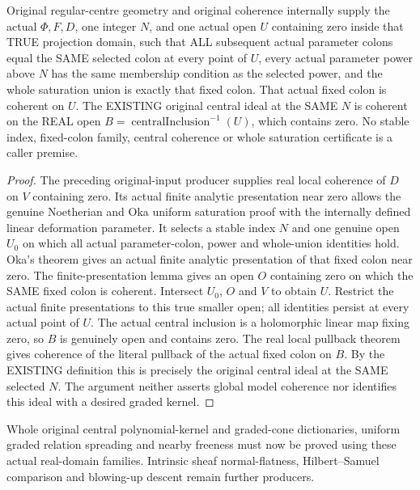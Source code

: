 \begin{theorem}
\label{hir:real-domain-original-exact-deformation-central-model}
\leanok
Original regular-centre geometry and original coherence internally
supply the actual $\Phi,F,D$, one integer $N$, and one actual open $U$
containing zero inside that TRUE projection domain, such that ALL
subsequent actual parameter colons equal the SAME selected colon at
every point of $U$, every actual parameter power above $N$ has the
same membership condition as the selected power, and the whole
saturation union is exactly that fixed colon. That actual fixed colon
is coherent on $U$. The EXISTING original central ideal at the SAME
$N$ is coherent on the REAL open
$B=\operatorname{centralInclusion}^{-1}(U)$, which contains zero.
No stable index, fixed-colon family, central coherence or whole
saturation certificate is a caller premise.
\end{theorem}
\begin{proof}
The preceding original-input producer supplies real local coherence
of $D$ on $V$ containing zero. Its actual finite analytic presentation
near zero allows the genuine Noetherian and Oka uniform saturation
proof with the internally defined linear deformation parameter.
It selects a stable index $N$ and one genuine open $U_0$ on which
all actual parameter-colon, power and whole-union identities hold.
Oka's theorem gives an actual finite analytic presentation of that
fixed colon near zero. The finite-presentation lemma gives an open
$O$ containing zero on which the SAME fixed colon is coherent.
Intersect $U_0$, $O$ and $V$ to obtain $U$. Restrict the actual finite
presentations to this true smaller open; all identities persist at
every actual point of $U$. The actual central inclusion is a
holomorphic linear map fixing zero, so $B$ is genuinely open and
contains zero. The real local pullback theorem gives coherence of
the literal pullback of the actual fixed colon on $B$. By the
EXISTING definition this is precisely the original central ideal
at the SAME selected $N$. The argument neither asserts global model
coherence nor identifies this ideal with a desired graded kernel.
\end{proof}

Whole original central polynomial-kernel and graded-cone dictionaries,
uniform graded relation spreading and nearby freeness must now be
proved using these actual real-domain families. Intrinsic sheaf
normal-flatness, Hilbert--Samuel comparison and blowing-up descent
remain further producers.
